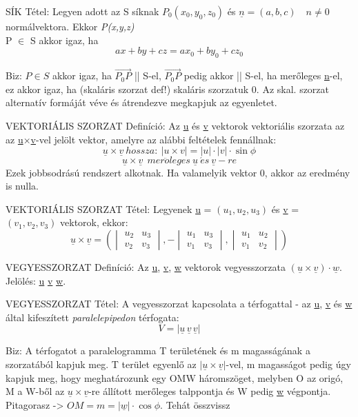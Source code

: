 \documentclass[]{article}
\newcommand{\Und}[1]{\underline{#1}}
\begin{document}
\begin{framed}
SÍK Tétel: Legyen adott az S síknak $P_0(x_0,y_0,z_0)$ és $\underline{n} = (a,b,c)\quad n\neq0$ normálvektora. Ekkor \textit{P(x,y,z)}\\ P $\in$ S akkor igaz, ha
$$ax+by+cz=ax_0+by_0+cz_0$$
\end{framed}
\begin{leftbar}
Biz: $P \in S$ akkor igaz, ha $\vec{P_0P}$ || S-el, $\vec{P_0P}$ pedig akkor || S-el, ha merőleges \underline{n}-el, ez akkor igaz, ha (skaláris szorzat def!) skaláris szorzatuk 0. Az skal. szorzat alternatív formáját véve és átrendezve megkapjuk az egyenletet.
\end{leftbar}
\begin{shaded}
VEKTORIÁLIS SZORZAT Definíció: Az \underline{u} és \underline{v} vektorok vektoriális szorzata az az \underline{u}×\underline{v}-vel jelölt
vektor, amelyre az alábbi feltételek fennállnak:
$$\underline{u} \times \underline{v}\: hossza:\: |u \times v| = |u| \cdot |v| \cdot\sin\phi$$
$$\underline{u} \times \underline{v}\ \: mer\ddot{o}leges\: \underline{u}\: \acute{e}s\: \underline{v}-re$$
Ezek jobbsodrású rendszert alkotnak. Ha valamelyik vektor 0, akkor az eredmény is nulla.
\end{shaded}
\begin{framed}
VEKTORIÁLIS SZORZAT Tétel: Legyenek \underline{u} = $(u_1,u_2,u_3)$ és \underline{v} = $(v_1,v_2,v_3)$ vektorok, ekkor:
$$\underline{u}\times\underline{v} = \left( \begin{vmatrix}
u_2&u_3\\v_2&v_3\end{vmatrix},-\begin{vmatrix}
u_1&u_3\\v_1&v_3\end{vmatrix},\begin{vmatrix}
u_1&u_2\\v_1&v_2\end{vmatrix} \right)$$
\end{framed}
\begin{shaded}
VEGYESSZORZAT Definíció: Az \Und{u}, \Und{v}, \Und{w}  vektorok vegyesszorzata $(\Und{u}\times\Und{v})\cdot\Und{w}$.\\Jelölés: \Und{u} \Und{v} \Und{w}.
\end{shaded}
\begin{framed}
VEGYESSZORZAT Tétel: A vegyesszorzat kapcsolata a térfogattal - az \Und{u}, \Und{v} és \Und{w} által kifeszített \textit{paralelepipedon} térfogata:
$$V = |\Und{u}\, \Und{v}\, \Und{v}|$$
\end{framed}
\begin{leftbar}
Biz: A térfogatot a paralelogramma T területének és m magasságának a szorzatából kapjuk meg. T terület egyenlő az $|\Und{u}\times\Und{v}|$-vel, m magasságot pedig úgy kapjuk meg, hogy meghatározunk egy OMW háromszöget, melyben O az origó, M a W-ből az $\Und{u}\times\Und{v}$-re állított merőleges talppontja és W pedig \Und{w} végpontja. Pitagorasz -> $OM = m = |\Und{w}| \cdot \cos\phi$. Tehát összvissz 
\end{leftbar}
\end{document}
